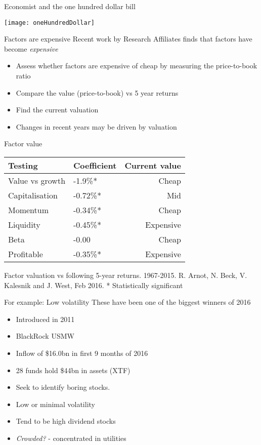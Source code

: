 \documentclass[14pt,xcolor=pdftex,dvipsnames,table]{beamer}\usepackage[]{graphicx}\usepackage[]{color}
\begin{document}
\begin{frame}{Economist and the one hundred dollar bill}
\begin{center}
\texttt{[image: oneHundredDollar]}
\end{center}
\end{frame}

\begin{frame}{Factors are expensive}
Recent work by Research Affiliates finds that factors have become \emph{expensive}
\begin{itemize}[<+-| alert@+>]
\pause
\item Assess whether factors are expensive of cheap by measuring the price-to-book ratio
\item Compare the value (price-to-book) vs 5 year returns
\item Find the current valuation
\item Changes in recent years  may be driven by valuation
\end{itemize}
\end{frame}

\begin{frame}{Factor value}
\begin{table}
\begin{center}
\begin{tabular}{l  p{2.3cm} r}
\textbf{Testing} & \textbf{Coefficient} & \textbf{Current value}\\
\hline
Value vs growth & -1.9\%* & Cheap\\
Capitalisation & -0.72\%* & Mid\\
Momentum & -0.34\%* & Cheap\\
Liquidity & -0.45\%* & Expensive\\ 
Beta & -0.00 & Cheap\\
Profitable & -0.35\%* & Expensive\\
\end{tabular}
\end{center}
\end{table}
Factor valuation vs following 5-year returns.  1967-2015.  R. Arnot, N. Beck, V. Kalesnik and J. West, Feb 2016.  
* Statistically significant
\end{frame}

\begin{frame}{For example: Low volatility}
These have been one of the biggest winners of 2016
\begin{itemize}[<+-| alert@+>]
\pause
\item Introduced in 2011
\item BlackRock USMW 
\item Inflow of \$16.0bn in first 9 months of 2016
\item 28 funds hold \$44bn in assets (XTF)
\item Seek to identify boring stocks.  
\item Low or minimal volatility
\item Tend to be high dividend stocks
\item \emph{Crowded?} - concentrated in utilities
\end{itemize}
\end{frame}
\end{document}
